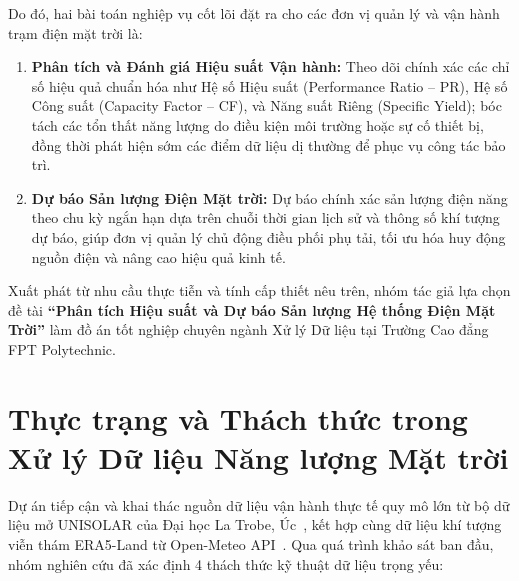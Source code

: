\documentclass[12pt, a4paper]{report}
\begin{document}
Do đó, hai bài toán nghiệp vụ cốt lõi đặt ra cho các đơn vị quản lý và vận hành trạm điện mặt trời là:
\begin{enumerate}[noitemsep]
    \item \textbf{Phân tích và Đánh giá Hiệu suất Vận hành:} Theo dõi chính xác các chỉ số hiệu quả chuẩn hóa như Hệ số Hiệu suất (Performance Ratio -- PR), Hệ số Công suất (Capacity Factor -- CF), và Năng suất Riêng (Specific Yield); bóc tách các tổn thất năng lượng do điều kiện môi trường hoặc sự cố thiết bị, đồng thời phát hiện sớm các điểm dữ liệu dị thường để phục vụ công tác bảo trì.
    \item \textbf{Dự báo Sản lượng Điện Mặt trời:} Dự báo chính xác sản lượng điện năng theo chu kỳ ngắn hạn dựa trên chuỗi thời gian lịch sử và thông số khí tượng dự báo, giúp đơn vị quản lý chủ động điều phối phụ tải, tối ưu hóa huy động nguồn điện và nâng cao hiệu quả kinh tế.
\end{enumerate}

Xuất phát từ nhu cầu thực tiễn và tính cấp thiết nêu trên, nhóm tác giả lựa chọn đề tài \textbf{``Phân tích Hiệu suất và Dự báo Sản lượng Hệ thống Điện Mặt Trời''} làm đồ án tốt nghiệp chuyên ngành Xử lý Dữ liệu tại Trường Cao đẳng FPT Polytechnic.

\section{Thực trạng và Thách thức trong Xử lý Dữ liệu Năng lượng Mặt trời}
\label{sec:thuctrang_thachthuc}

Dự án tiếp cận và khai thác nguồn dữ liệu vận hành thực tế quy mô lớn từ bộ dữ liệu mở UNISOLAR của Đại học La Trobe, Úc~\cite{wimalaratne2022unisolar}, kết hợp cùng dữ liệu khí tượng viễn thám ERA5-Land từ Open-Meteo API~\cite{openmeteo2023}. Qua quá trình khảo sát ban đầu, nhóm nghiên cứu đã xác định 4 thách thức kỹ thuật dữ liệu trọng yếu:
\end{document}
